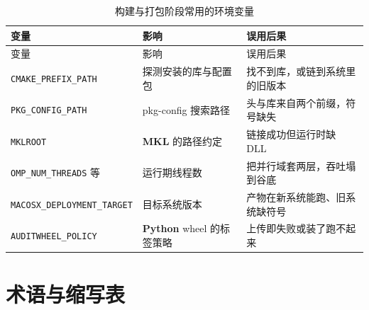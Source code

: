 \documentclass[12pt,a4paper,fontset=fandol]{ctexbook}
\newcommand{\Tp}[1]{\texttt{#1}}
\newcommand{\Bk}{\allowbreak}
\newcommand{\Lib}[1]{\textbf{#1}}
\newcommand{\Lang}[1]{\textsf{\bfseries #1}}
\newcommand{\PY}{\Lang{Python}}
\begin{document}
\begin{longtable}{@{}>{\raggedright\arraybackslash}p{}
  >{\raggedright\arraybackslash}p{}
  >{\raggedright\arraybackslash}p{}@{}}
\caption{构建与打包阶段常用的环境变量}\label{tab:apB-env}\\
\toprule
变量 & 影响 & 误用后果 \\
\midrule
\endfirsthead
\toprule
变量 & 影响 & 误用后果 \\
\midrule
\endhead
\Tp{CMAKE\_PREFIX\_PATH} & 探测安装的库与配置包 &
  找不到库，或链到系统里的旧版本 \\
\Tp{PKG\_CONFIG\_PATH} & pkg-config 搜索路径 &
  头与库来自两个前缀，符号缺失 \\
\Tp{MKLROOT} & \Lib{MKL} 的路径约定 &
  链接成功但运行时缺 DLL \\
\Tp{OMP\_NUM\_THREADS} 等 & 运行期线程数 &
  把并行域套两层，吞吐塌到谷底 \\
\Tp{MACOSX\_}\Bk\Tp{DEPLOYMENT\_}\Bk\Tp{TARGET} & 目标系统版本 &
  产物在新系统能跑、旧系统缺符号 \\
\Tp{AUDITWHEEL\_POLICY} & \PY{} wheel 的标签策略 &
  上传即失败或装了跑不起来 \\
\end{longtable}

\chapter{术语与缩写表}
\end{document}
